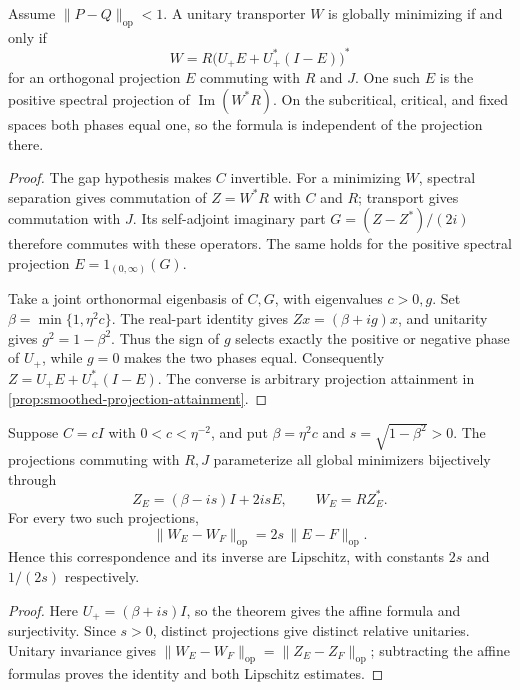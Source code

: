 \begin{theorem}
\label{thm:smoothed-acute-projections}
Assume $\|P-Q\|_{\mathrm{op}}<1$. A unitary transporter $W$ is
globally minimizing if and only if
\[
 W=R\bigl(U_+E+U_+^*(I-E)\bigr)^*
\]
for an orthogonal projection $E$ commuting with $R$ and $J$.
One such $E$ is the positive spectral projection of
$\operatorname{Im}(W^*R)$. On the subcritical, critical, and fixed
spaces both phases equal one, so the formula is independent of the
projection there.
\end{theorem}

\begin{proof}
The gap hypothesis makes $C$ invertible. For a minimizing $W$, spectral
separation gives commutation of $Z=W^*R$ with $C$ and $R$; transport gives
commutation with $J$. Its self-adjoint imaginary part
$G=(Z-Z^*)/(2i)$ therefore commutes with these operators. The same holds
for the positive spectral projection $E=1_{(0,\infty)}(G)$.

Take a joint orthonormal eigenbasis of $C,G$, with eigenvalues $c>0,g$.
Set $\beta=\min\{1,\eta^2c\}$. The real-part identity gives
$Zx=(\beta+ig)x$, and unitarity gives
$g^2=1-\beta^2$. Thus the sign of $g$ selects exactly the positive or
negative phase of $U_+$, while $g=0$ makes the two phases equal.
Consequently $Z=U_+E+U_+^*(I-E)$. The converse is arbitrary projection
attainment in \cref{prop:smoothed-projection-attainment}.
\end{proof}

\begin{corollary}
\label{cor:smoothed-isoclinic-metric}
Suppose $C=cI$ with $0<c<\eta^{-2}$, and put
$\beta=\eta^2c$ and $s=\sqrt{1-\beta^2}>0$. The projections commuting
with $R,J$ parameterize all global minimizers bijectively through
\[
 Z_E=(\beta-is)I+2isE,\qquad W_E=RZ_E^*.
\]
For every two such projections,
\[
 \|W_E-W_F\|_{\mathrm{op}}=2s\,\|E-F\|_{\mathrm{op}}.
\]
Hence this correspondence and its inverse are Lipschitz, with constants
$2s$ and $1/(2s)$ respectively.
\end{corollary}

\begin{proof}
Here $U_+=(\beta+is)I$, so the theorem gives the affine formula and
surjectivity. Since $s>0$, distinct projections give distinct relative
unitaries. Unitary invariance gives
$\|W_E-W_F\|_{\mathrm{op}}=\|Z_E-Z_F\|_{\mathrm{op}}$; subtracting the
affine formulas proves the identity and both Lipschitz estimates.
\end{proof}

